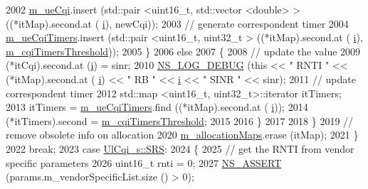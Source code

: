 \begin{DoxyCode}
2002                 \hyperlink{classns3_1_1TdTbfqFfMacScheduler_a5cf85878fa75fd31bdc63527492e9270}{m\_ueCqi}.insert (std::pair <uint16\_t, std::vector <double> > ((*itMap).second.at (
      \hyperlink{bernuolliDistribution_8m_a6f6ccfcf58b31cb6412107d9d5281426}{i}), newCqi));
2003                 \textcolor{comment}{// generate correspondent timer}
2004                 \hyperlink{classns3_1_1TdTbfqFfMacScheduler_abc6132bce28b1ee650503bf3144eb22a}{m\_ueCqiTimers}.insert (std::pair <uint16\_t, uint32\_t > ((*itMap).second.at (
      \hyperlink{bernuolliDistribution_8m_a6f6ccfcf58b31cb6412107d9d5281426}{i}), \hyperlink{classns3_1_1TdTbfqFfMacScheduler_a4a154b47a91bb301ab183ce57e44c431}{m\_cqiTimersThreshold}));
2005               \}
2006             \textcolor{keywordflow}{else}
2007               \{
2008                 \textcolor{comment}{// update the value}
2009                 (*itCqi).second.at (\hyperlink{bernuolliDistribution_8m_a6f6ccfcf58b31cb6412107d9d5281426}{i}) = sinr;
2010                 \hyperlink{group__logging_ga413f1886406d49f59a6a0a89b77b4d0a}{NS\_LOG\_DEBUG} (\textcolor{keyword}{this} << \textcolor{stringliteral}{" RNTI "} << (*itMap).second.at (
      \hyperlink{bernuolliDistribution_8m_a6f6ccfcf58b31cb6412107d9d5281426}{i}) << \textcolor{stringliteral}{" RB "} << \hyperlink{bernuolliDistribution_8m_a6f6ccfcf58b31cb6412107d9d5281426}{i} << \textcolor{stringliteral}{" SINR "} << sinr);
2011                 \textcolor{comment}{// update correspondent timer}
2012                 std::map <uint16\_t, uint32\_t>::iterator itTimers;
2013                 itTimers = \hyperlink{classns3_1_1TdTbfqFfMacScheduler_abc6132bce28b1ee650503bf3144eb22a}{m\_ueCqiTimers}.find ((*itMap).second.at (
      \hyperlink{bernuolliDistribution_8m_a6f6ccfcf58b31cb6412107d9d5281426}{i}));
2014                 (*itTimers).second = \hyperlink{classns3_1_1TdTbfqFfMacScheduler_a4a154b47a91bb301ab183ce57e44c431}{m\_cqiTimersThreshold};
2015 
2016               \}
2017 
2018           \}
2019         \textcolor{comment}{// remove obsolete info on allocation}
2020         \hyperlink{classns3_1_1TdTbfqFfMacScheduler_a0801127489d3eda5a462660c4af4c8bd}{m\_allocationMaps}.erase (itMap);
2021       \}
2022       \textcolor{keywordflow}{break};
2023     \textcolor{keywordflow}{case} \hyperlink{structns3_1_1UlCqi__s_aece9e5ebea42eb9ff1744c72c8459b57af4b6dba4243636562c910c4d4761dd7e}{UlCqi\_s::SRS}:
2024       \{
2025         \textcolor{comment}{// get the RNTI from vendor specific parameters}
2026         uint16\_t rnti = 0;
2027         \hyperlink{assert_8h_a6dccdb0de9b252f60088ce281c49d052}{NS\_ASSERT} (params.m\_vendorSpecificList.size () > 0);

\end{DoxyCode}
